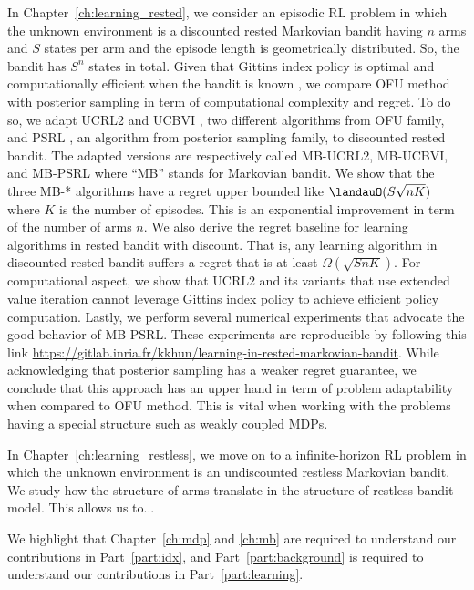 In Chapter~\ref{ch:learning_rested}, we consider an episodic RL problem in which the unknown environment is a discounted rested Markovian bandit having $n$ arms and $S$ states per arm and the episode length is geometrically distributed.
So, the bandit has $S^n$ states in total.
Given that Gittins index policy is optimal and computationally efficient when the bandit is known \cite{gittins1979bandit}, we compare OFU method with posterior sampling in term of computational complexity and regret.
To do so, we adapt UCRL2 \cite{jaksch2010near} and UCBVI \cite{azar2017minimax}, two different algorithms from OFU family, and PSRL \cite{osband2013more}, an algorithm from posterior sampling family, to discounted rested bandit.
The adapted versions are respectively called MB-UCRL2, MB-UCBVI, and MB-PSRL where ``MB'' stands for Markovian bandit.
We show that the three MB-* algorithms have a regret upper bounded like $\landauO(S\sqrt{nK})$ where $K$ is the number of episodes.
This is an exponential improvement in term of the number of arms $n$.
We also derive the regret baseline for learning algorithms in rested bandit with discount.
That is, any learning algorithm in discounted rested bandit suffers a regret that is at least $\Omega(\sqrt{SnK})$.
For computational aspect, we show that UCRL2 and its variants that use extended value iteration \cite{jaksch2010near} cannot leverage Gittins index policy to achieve efficient policy computation.
Lastly, we perform several numerical experiments that advocate the good behavior of MB-PSRL.
These experiments are reproducible by following this link \url{https://gitlab.inria.fr/kkhun/learning-in-rested-markovian-bandit}.
While acknowledging that posterior sampling has a weaker regret guarantee, we conclude that this approach has an upper hand in term of problem adaptability when compared to OFU method.
This is vital when working with the problems having a special structure such as weakly coupled MDPs.

In Chapter~\ref{ch:learning_restless}, we move on to a infinite-horizon RL problem in which the unknown environment is an undiscounted restless Markovian bandit.
We study how the structure of arms translate in the structure of restless bandit model.
This allows us to...


We highlight that Chapter~\ref{ch:mdp} and \ref{ch:mb} are required to understand our contributions in Part~\ref{part:idx}, and
Part~\ref{part:background} is required to understand our contributions in Part~\ref{part:learning}.

